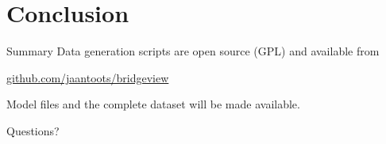 \documentclass{beamer}
\begin{document}
\section{Conclusion}

\begin{frame}{Summary}
  Data generation scripts are open source (GPL) and available from

  \begin{center}
    \href{https://github.com/jaantoots/bridgeview}{github.com/jaantoots/bridgeview}
  \end{center}

  Model files and the complete dataset will be made available.
\end{frame}

\begin{frame}[standout]
  Questions?
\end{frame}
\end{document}
